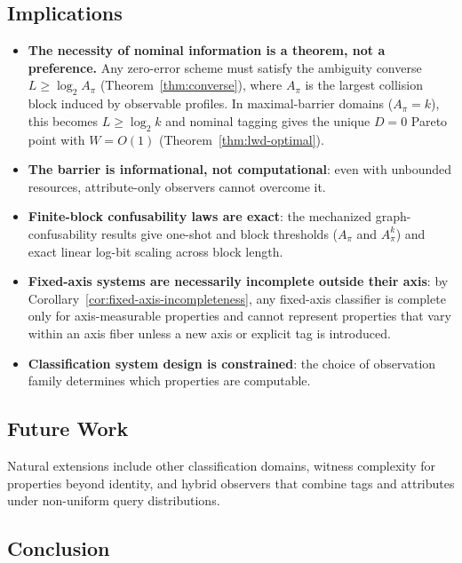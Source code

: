 \subsection{Implications}

\begin{itemize}
\item \textbf{The necessity of nominal information is a theorem, not a preference.} Any zero-error scheme must satisfy the ambiguity converse $L \ge \log_2 A_\pi$ (Theorem~\ref{thm:converse}), where $A_\pi$ is the largest collision block induced by observable profiles. In maximal-barrier domains ($A_\pi = k$), this becomes $L \ge \log_2 k$ and nominal tagging gives the unique $D=0$ Pareto point with $W=O(1)$ (Theorem~\ref{thm:lwd-optimal}).

\item \textbf{The barrier is informational, not computational}: even with unbounded resources, attribute-only observers cannot overcome it.

\item \textbf{Finite-block confusability laws are exact}: the mechanized graph-confusability results give one-shot and block thresholds ($A_\pi$ and $A_\pi^k$) and exact linear log-bit scaling across block length.

\item \textbf{Fixed-axis systems are necessarily incomplete outside their axis}: by Corollary~\ref{cor:fixed-axis-incompleteness}, any fixed-axis classifier is complete only for axis-measurable properties and cannot represent properties that vary within an axis fiber unless a new axis or explicit tag is introduced.

\item \textbf{Classification system design is constrained}: the choice of observation family determines which properties are computable.
\end{itemize}

\subsection{Future Work}

Natural extensions include other classification domains, witness complexity for properties beyond identity, and hybrid observers that combine tags and attributes under non-uniform query distributions.

\subsection{Conclusion}

